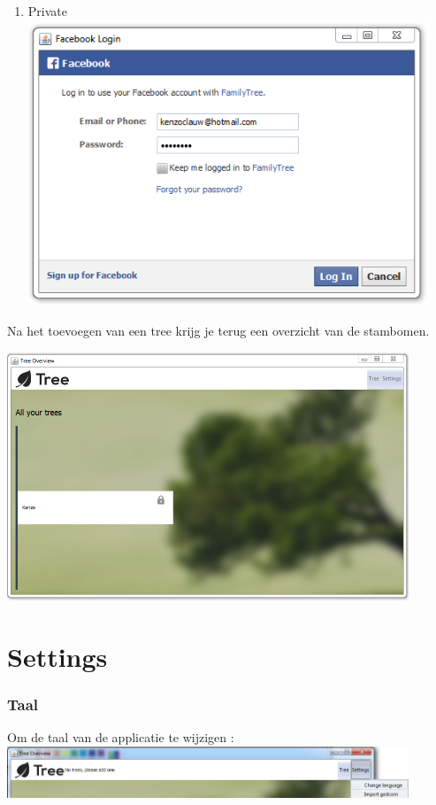 \documentclass[pdftex,a4paper,12pt,twoside]{report}
\begin{document}
\begin{enumerate}
\item \label{it:first}Private
\includegraphics[width=12cm]{images/facebook.png}\\[.5cm]
\end{enumerate}

Na het toevoegen van een tree krijg je terug een overzicht van de stambomen.

\includegraphics[width=12cm]{images/user_treeoverview_full.png}\\[.5cm]

\chapter{Settings}
\subsection{Taal}
Om de taal van de applicatie te wijzigen :
\includegraphics[width=12cm]{images/change_language.png}\\[.5cm]
\end{document}
